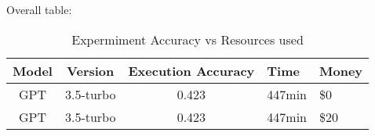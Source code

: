 Overall table:

\begin{table}[!ht]
    \centering
    \begin{tabular}{|c|c|c|L|L|}
        \hline
        Model & Version   & \textbf{Execution Accuracy} & \textbf{Time} & \textbf{Money} \\ \hline
        GPT   & 3.5-turbo & 0.423                       & 447min        & \$0            \\ \hline
        GPT   & 3.5-turbo & 0.423                       & 447min        & \$20           \\ \hline
    \end{tabular}
    \caption{Expermiment Accuracy vs Resources used}
\end{table}